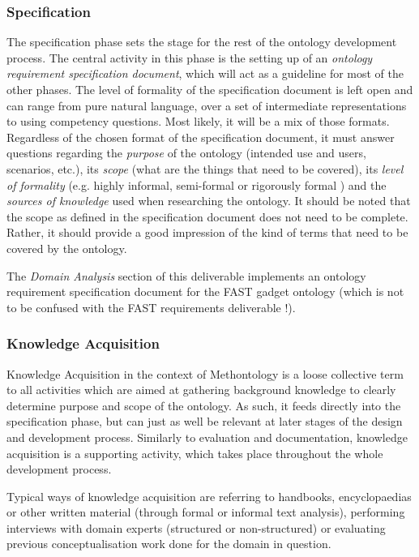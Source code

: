 \documentclass{fast_latex}
\begin{document}
\subsubsection{Specification} %
\label{ssub:specification}

The specification phase sets the stage for the rest of the ontology development process. The central activity in this phase is the setting up of an \emph{ontology requirement specification document}, which will act as a guideline for most of the other phases. The level of formality of the specification document is left open and can range from pure natural language, over a set of intermediate representations to using competency questions. Most likely, it will be a mix of those formats. Regardless of the chosen format of the specification document, it must answer questions regarding the \emph{purpose} of the ontology (intended use and users, scenarios, etc.), its \emph{scope} (what are the things that need to be covered), its \emph{level of formality} (e.g. highly informal, semi-formal or rigorously formal \cite{uschold1996ontologies}) and the \emph{sources of knowledge} used when researching the ontology. It should be noted that the scope as defined in the specification document does not need to be complete. Rather, it should provide a good impression of the kind of terms that need to be covered by the ontology.

The \emph{Domain Analysis} section of this deliverable implements an ontology requirement specification document for the FAST gadget ontology (which is not to be confused with the FAST requirements deliverable \cite{villoslada2009fast_requirements}!).

\subsubsection{Knowledge Acquisition} %
\label{ssub:knowledge_acquisition}

Knowledge Acquisition in the context of Methontology is a loose collective term to all activities which are aimed at gathering background knowledge to clearly determine purpose and scope of the ontology. As such, it feeds directly into the specification phase, but can just as well be relevant at later stages of the design and development process. Similarly to evaluation and documentation, knowledge acquisition is a supporting activity, which takes place throughout the whole development process.

Typical ways of knowledge acquisition are referring to handbooks, encyclopaedias or other written material (through formal or informal text analysis), performing interviews with domain experts (structured or non-structured) or evaluating previous conceptualisation work done for the domain in question.
\end{document}
